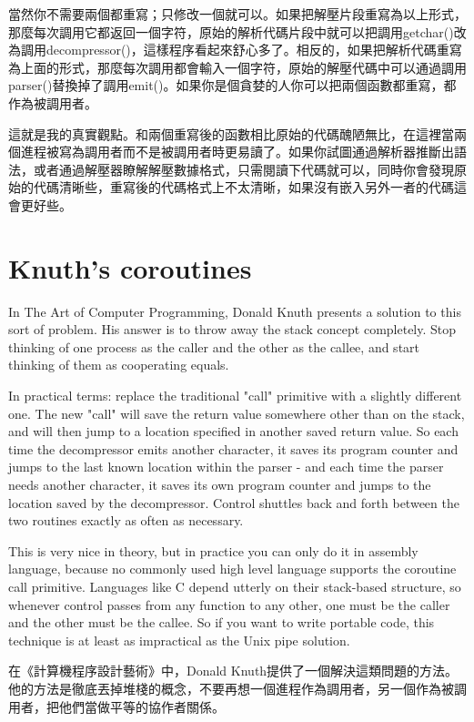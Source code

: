 \documentclass[12pt]{article}
\begin{document}
\begin{CJK}{UTF8}{bsmi}
 當然你不需要兩個都重寫；只修改一個就可以。如果把解壓片段重寫為以上形式，那麼每次調用它都返回一個字符，原始的解析代碼片段中就可以把調用getchar()改為調用decompressor()，這樣程序看起來舒心多了。相反的，如果把解析代碼重寫為上面的形式，那麼每次調用都會輸入一個字符，原始的解壓代碼中可以通過調用parser()替換掉了調用emit()。如果你是個貪婪的人你可以把兩個函數都重寫，都作為被調用者。

這就是我的真實觀點。和兩個重寫後的函數相比原始的代碼醜陋無比，在這裡當兩個進程被寫為調用者而不是被調用者時更易讀了。如果你試圖通過解析器推斷出語法，或者通過解壓器瞭解解壓數據格式，只需閱讀下代碼就可以，同時你會發現原始的代碼清晰些，重寫後的代碼格式上不太清晰，如果沒有嵌入另外一者的代碼這會更好些。 

\section{Knuth's coroutines}
 In The Art of Computer Programming, Donald Knuth presents a solution to this sort of problem. His answer is to throw away the stack concept completely. Stop thinking of one process as the caller and the other as the callee, and start thinking of them as cooperating equals.

 In practical terms: replace the traditional "call" primitive with a slightly different one. The new "call" will save the return value somewhere other than on the stack, and will then jump to a location specified in another saved return value. So each time the decompressor emits another character, it saves its program counter and jumps to the last known location within the parser - and each time the parser needs another character, it saves its own program counter and jumps to the location saved by the decompressor. Control shuttles back and forth between the two routines exactly as often as necessary.

 This is very nice in theory, but in practice you can only do it in assembly language, because no commonly used high level language supports the coroutine call primitive. Languages like C depend utterly on their stack-based structure, so whenever control passes from any function to any other, one must be the caller and the other must be the callee. So if you want to write portable code, this technique is at least as impractical as the Unix pipe solution.

 在《計算機程序設計藝術》中，Donald Knuth提供了一個解決這類問題的方法。他的方法是徹底丟掉堆棧的概念，不要再想一個進程作為調用者，另一個作為被調用者，把他們當做平等的協作者關係。


\end{CJK}
\end{document}
